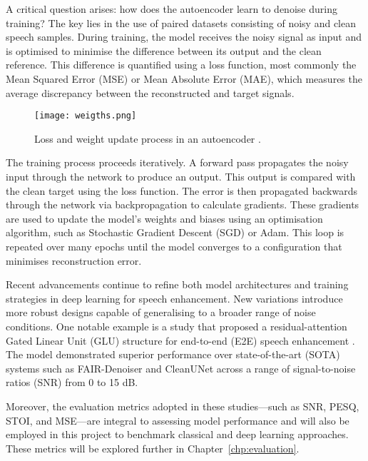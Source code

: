 A critical question arises: how does the autoencoder learn to denoise during training? The key lies in the use of paired datasets consisting of noisy and clean speech samples. During training, the model receives the noisy signal as input and is optimised to minimise the difference between its output and the clean reference. This difference is quantified using a loss function, most commonly the Mean Squared Error (MSE) or Mean Absolute Error (MAE), which measures the average discrepancy between the reconstructed and target signals.

\begin{figure}[h]
    \centering
    \texttt{[image: weigths.png]}
    \caption{\label{fig:weigths} Loss and weight update process in an autoencoder \cite{epoch2021}.}
\end{figure}

The training process proceeds iteratively. A forward pass propagates the noisy input through the network to produce an output. This output is compared with the clean target using the loss function. The error is then propagated backwards through the network via backpropagation to calculate gradients. These gradients are used to update the model’s weights and biases using an optimisation algorithm, such as Stochastic Gradient Descent (SGD) or Adam. This loop is repeated over many epochs until the model converges to a configuration that minimises reconstruction error.

Recent advancements continue to refine both model architectures and training strategies in deep learning for speech enhancement. New variations introduce more robust designs capable of generalising to a broader range of noise conditions. One notable example is a study that proposed a residual-attention Gated Linear Unit (GLU) structure for end-to-end (E2E) speech enhancement \cite{kim2024residual}. The model demonstrated superior performance over state-of-the-art (SOTA) systems such as FAIR-Denoiser and CleanUNet across a range of signal-to-noise ratios (SNR) from 0 to 15 dB.

Moreover, the evaluation metrics adopted in these studies—such as SNR, PESQ, STOI, and MSE—are integral to assessing model performance and will also be employed in this project to benchmark classical and deep learning approaches. These metrics will be explored further in Chapter~\ref{chp:evaluation}.

